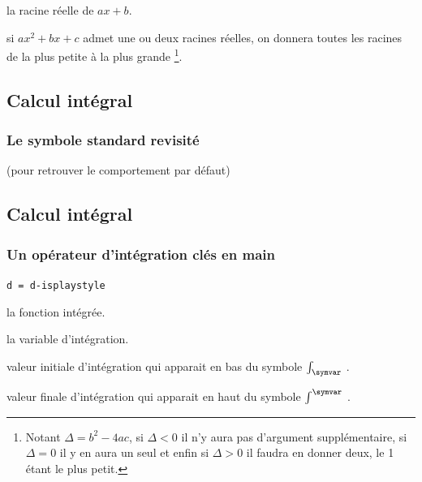 \documentclass[12pt,a4paper]{book}
\theoremstyle{definition}
\newcommand\extraspace{
	\vspace{0.25em}
}
\newcommand\mwhyprefix[2]{%
	\texttt{#1 = #1-#2}%
}
\begin{document}
{{ la racine réelle de $ax + b$.


 si $ax^2 + bx + c$ admet une ou deux racines réelles, on donnera toutes les racines de la plus petite à la plus grande
\footnote{
	Notant $\Delta = b^2 - 4 ac$, si $\Delta < 0$ il n'y aura pas d'argument supplémentaire, si $\Delta = 0$ il y en aura un seul et enfin si $\Delta > 0$ il faudra en donner deux, le 1\ier{} étant le plus petit.
}.


\subsection{Calcul intégral}

\subsubsection{Le symbole standard revisité}



 (pour retrouver le comportement par défaut)




\subsection{Calcul intégral}

\subsubsection{Un opérateur d'intégration clés en main}





\extraspace

  \hfill \mwhyprefix{d}{isplaystyle}



 la fonction intégrée.

 la variable d'intégration.

 valeur initiale d'intégration qui apparait en bas du symbole $\int_{\symvar}$ .

 valeur finale d'intégration qui apparait en haut du symbole $\int^{\symvar}$ .





}}
\end{document}
